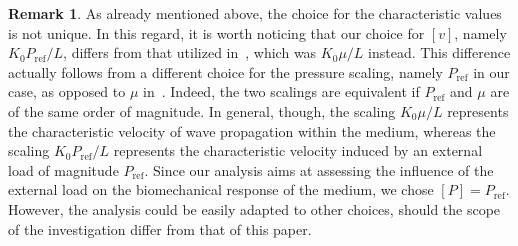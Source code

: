 \documentclass[12pt,a4paper]{amsart}
\theoremstyle{definition}
\newtheorem{remark}{Remark}
\begin{document}
\begin{remark}
As already mentioned above, the choice for the characteristic values is not unique. In this regard, it is worth noticing that our choice for $[v]$, namely $K_0 P_{\text{ref}}/L$, differs from that utilized in~\cite{Soltz1998}, which was $K_0 \mu/L$ instead. This difference actually follows from a different choice for the pressure scaling, namely $P_{\text{ref}}$ in our case, as opposed to $\mu$ in~\cite{Soltz1998}. Indeed, the two scalings are equivalent if $P_{\text{ref}}$  and $\mu$ are of the same order of magnitude. In general, though, the scaling $K_0 \mu/L$ represents the characteristic velocity of wave propagation within the medium, whereas the scaling $K_0 P_{\text{ref}}/L$ represents the characteristic velocity induced by an external load of magnitude $P_{\text{ref}}$. Since our analysis aims at assessing the influence of the external load on the biomechanical response of the medium, we chose $[P]=P_{\text{ref}}$. However, the analysis could be easily adapted to other choices, should the scope of the investigation differ from that of this paper.
\end{remark}
\end{document}
